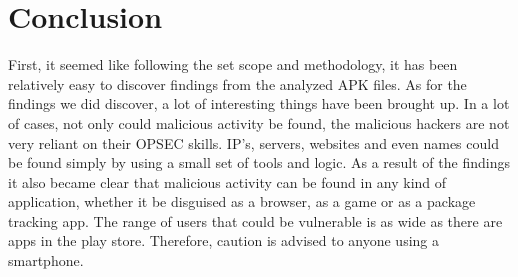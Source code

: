 \section{Conclusion}

First, it seemed like following the set scope and methodology, it has been relatively easy to discover findings from the analyzed APK files.
As for the findings we did discover, a lot of interesting things have been brought up.
In a lot of cases, not only could malicious activity be found, the malicious hackers are not very reliant on their OPSEC skills.
IP’s, servers, websites and even names could be found simply by using a small set of tools and logic.
As a result of the findings it also became clear that malicious activity can be found in any kind of application, whether it be disguised as a browser, as a game or as a package tracking app.
The range of users that could be vulnerable is as wide as there are apps in the play store.
Therefore, caution is advised to anyone using a smartphone.